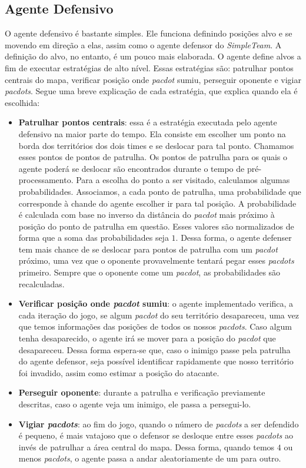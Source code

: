\documentclass[a4paper,12pt]{article}
\begin{document}
\subsection{Agente Defensivo}
O agente defensivo é bastante simples. Ele funciona definindo posições alvo e se movendo em direção
a elas, assim como o agente defensor do \textit{SimpleTeam}. A definição do alvo, no entanto,
é um pouco mais elaborada. O agente define alvos a fim de executar estratégias de alto nível.
Essas estratégias são: patrulhar pontos centrais do mapa, verificar posição onde \textit{pacdot} sumiu,
perseguir oponente e vigiar \textit{pacdots}. Segue uma breve explicação de cada estratégia,
que explica quando ela é escolhida:

\begin{itemize}
  \item \textbf{Patrulhar pontos centrais}: essa é a estratégia executada pelo agente defensivo
  na maior parte do tempo. Ela consiste em escolher um ponto na borda dos territórios
  dos dois times e se deslocar para tal ponto. Chamamos esses pontos de pontos de patrulha.
  Os pontos de patrulha para os quais o agente poderá se deslocar são encontrados durante o
  tempo de pré-processamento. Para a escolha do ponto a ser visitado, calculamos algumas
  probabilidades. Associamos, a cada ponto de patrulha, uma probabilidade que corresponde
  à chande do agente escolher ir para tal posição. A probabilidade é calculada com base
  no inverso da distância do \textit{pacdot} mais próximo à posição do ponto de patrulha
  em questão. Esses valores são normalizados de forma que a soma das probabilidades seja $1$.
  Dessa forma, o agente defenser tem mais chance de se deslocar para pontos de patrulha
  com um \textit{pacdot} próximo, uma vez que o oponente provavelmente tentará pegar
  esses \textit{pacdots} primeiro. Sempre que o oponente come um \textit{pacdot}, as probabilidades
  são recalculadas.

  \item \textbf{Verificar posição onde \textit{pacdot} sumiu}: o agente implementado verifica,
  a cada iteração do jogo, se algum \textit{pacdot} do seu território desapareceu,
  uma vez que temos informações das posições de todos os nossos \textit{pacdots}.
  Caso algum tenha desaparecido, o agente irá se mover para a posição
  do \textit{pacdot} que desapareceu. Dessa forma espera-se que, caso o inimigo passe
  pela patrulha do agente defensor, seja possível identificar rapidamente que
  nosso território foi invadido, assim como estimar a posição do atacante.

  \item \textbf{Perseguir oponente}: durante a patrulha e verificação previamente
  descritas, caso o agente veja um inimigo, ele passa a persegui-lo.

  \item \textbf{Vigiar \textit{pacdots}}: ao fim do jogo,
  quando o número de \textit{pacdots} a ser defendido é pequeno, é mais vatajoso
  que o defensor se desloque entre esses \textit{pacdots} ao invés de patrulhar a área
  central do mapa. Dessa forma, quando temos $4$ ou menos \textit{pacdots}, o agente passa
  a andar aleatoriamente de um para outro.
\end{itemize}
\end{document}
